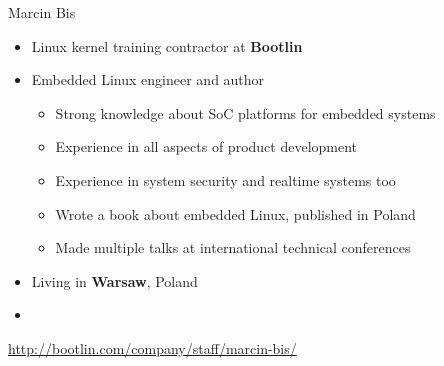 \begin{frame}{Marcin Bis}
    \begin{itemize}
      \item Linux kernel training contractor at {\bf Bootlin}
      \item Embedded Linux engineer and author
        \begin{itemize}
	  \item Strong knowledge about SoC platforms for embedded systems
	  \item Experience in all aspects of product development
	  \item Experience in system security and realtime systems too
	  \item Wrote a book about embedded Linux, published in Poland
	  \item Made multiple talks at international technical conferences
        \end{itemize}
      \item Living in {\bf Warsaw}, Poland
      \item {}
    \end{itemize}
    {\small \url{http://bootlin.com/company/staff/marcin-bis/}}
\end{frame}

